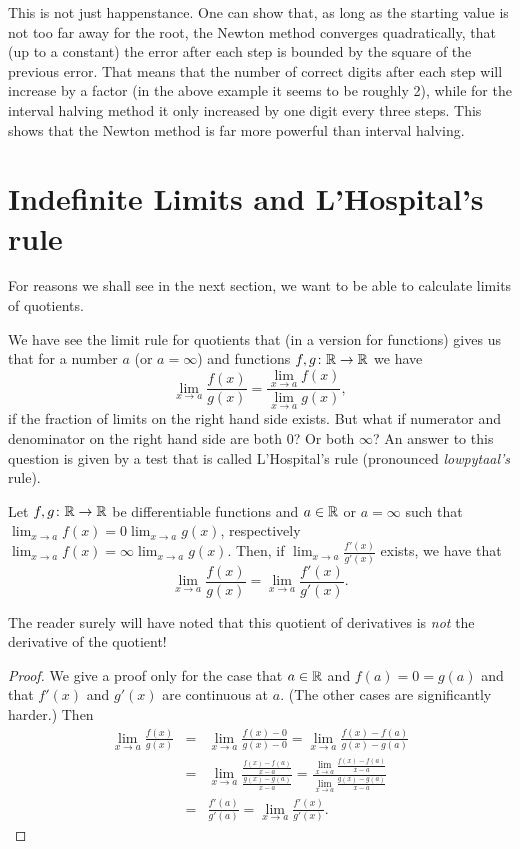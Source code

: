 This is not just happenstance. One can show that, as long as the starting
value is not too far away for the root, the Newton method converges
quadratically, that (up to a constant) the error after each step is bounded
by the square of the previous error. That means that the number of correct
digits after each step will increase by a factor (in the above example it
seems to be roughly 2), while for the interval halving method it only
increased by one digit every three steps. This shows that the Newton
method is far more powerful than interval halving.

\section{Indefinite Limits and L'Hospital's rule}
\label{seclhopital}

For reasons we shall see in the next section, we want to be able to
calculate limits of quotients.

We have see the limit rule for quotients that (in a version for
functions) gives us that for a number $a$ (or $a=\infty$) and functions
$f,g\colon{\mathbb R}\to{\mathbb R}$ we have
\[
\lim_{x\to a}\frac{f(x)}{g(x)}=\frac{\lim_{x\to a}f(x)}{\lim_{x\to a}g(x)},
\]
if the fraction of limits on the right hand side exists. But what if
numerator and denominator on the right hand side are both $0$? Or both
$\infty$? An answer to this question is given by a test that is
called
L'Hospital's rule (pronounced {\em lowpytaal's} rule).

\begin{thm}
Let $f,g\colon{\mathbb R}\to{\mathbb R}$ be differentiable functions and $a\in{\mathbb R}$ or
$a=\infty$ such that $\lim_{x\to a}f(x)=0\lim_{x\to a}g(x)$, respectively
$\lim_{x\to a}f(x)=\infty\lim_{x\to a}g(x)$. Then, if $\lim_{x\to
a}\frac{f'(x)}{g'(x)}$ exists, we have that
\[
\lim_{x\to a}\frac{f(x)}{g(x)}=\lim_{x\to a}\frac{f'(x)}{g'(x)}.
\]
\end{thm}
The reader surely will have noted that this quotient of derivatives is {\em
not} the derivative of the quotient!\\
\begin{proof}
We give a proof only for the case that $a\in{\mathbb R}$ and $f(a)=0=g(a)$ and that
$f'(x)$ and $g'(x)$ are continuous at $a$. (The other cases are
significantly harder.) Then
\begin{eqnarray*}
\lim_{x\to a}\frac{f(x)}{g(x)}
&=&\lim_{x\to a}\frac{f(x)-0}{g(x)-0}
=\lim_{x\to a}\frac{f(x)-f(a)}{g(x)-g(a)}\\
&=&\lim_{x\to a}\frac{\frac{f(x)-f(a)}{x-a}}{\frac{g(x)-g(a)}{x-a}}
=
\frac{\lim_{x\to a}\frac{f(x)-f(a)}{x-a}}{\lim_{x\to
a}\frac{g(x)-g(a)}{x-a}}\\
&=&\frac{f'(a)}{g'(a)}=\lim_{x\to a}\frac{f'(x)}{g'(x)}.
\end{eqnarray*}
\end{proof}

